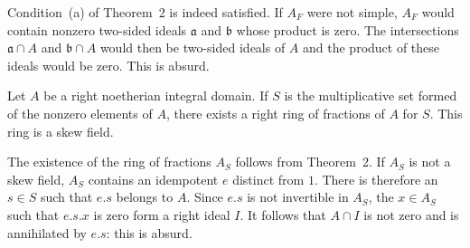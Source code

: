 Condition~(a) of Theorem~2 is indeed satisfied. If $A_F$ were not
simple, $A_F$ would contain nonzero two-sided ideals $\mathfrak{a}$
and $\mathfrak{b}$ whose product is zero. The intersections
$\mathfrak{a}\cap A$ and $\mathfrak{b}\cap A$ would then be two-sided
ideals of $A$ and the product of these ideals would be zero. This is
absurd.

\begin{corollary}
Let $A$ be a right noetherian integral domain. If $S$ is the
multiplicative set formed of the nonzero elements of $A$, there exists
a right ring of fractions of $A$ for $S$. This ring is a skew field.
\end{corollary}

The existence of the ring of fractions $A_S$ follows from Theorem~2. If
$A_S$ is not a skew field, $A_S$ contains an idempotent $e$ distinct
from $1$. There is therefore an $s\in S$ such that $e.s$ belongs to $A$.
Since $e.s$ is not invertible in $A_S$, the $x\in A_S$ such that
$e.s.x$ is zero form a right ideal $I$. It follows that $A\cap I$ is
not zero and is annihilated by $e.s$: this is absurd.
